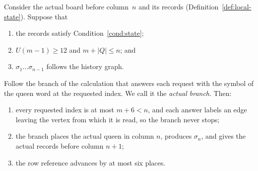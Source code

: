 \begin{lemma}\label{lem:local-exactness}
Consider the actual board before column~$n$ and its records
(Definition~\ref{def:local-state}). Suppose that
\begin{enumerate}
\item the records satisfy Condition~\ref{cond:state};
\item $U(m-1)\ge12$ and $m+|Q|\le n$; and
\item $\sigma_1\dots\sigma_{n-1}$ follows the history graph.
\end{enumerate}
Follow the branch of the calculation that answers each request with
the symbol of the queen word at the requested index. We call it the
\emph{actual branch}. Then:
\begin{enumerate}
\renewcommand{\labelenumi}{(\roman{enumi})}
\item every requested index is at most $m+6<n$, and each answer
labels an edge leaving the vertex from which it is read, so the
branch never stops;
\item the branch places the actual queen in column $n$, produces
$\sigma_n$, and gives the actual records before column $n+1$;
\item the row reference advances by at most six places.
\end{enumerate}
\end{lemma}

